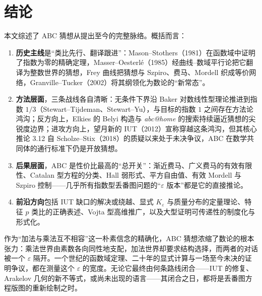 \section{结论}\label{sec:conclusion}

本文综述了 ABC 猜想从提出至今的完整脉络。概括而言：

\begin{enumerate}[label=(\arabic*)]
    \item \textbf{历史主线}是“类比先行、翻译跟进”：Mason--Stothers（1981）在函数域中证明了指数为零的精确定理，Masser--Oesterl\'e（1985）经曲线--数域平行论把它翻译为整数世界的猜想，Frey 曲线把猜想与 Szpiro、费马、Mordell 织成等价网络，Granville--Tucker（2002）将其纲领化为数论的“新常态”。
    \item \textbf{方法层面}，三条战线各自清晰：无条件下界沿 Baker 对数线性型理论推进到指数 $1/3$（Stewart--Tijdeman、Stewart--Yu），与目标的指数 $1$ 之间存在方法论鸿沟；反方向上，Elkies 的 Belyi 构造与 \textit{abc@home} 的搜索持续逼近猜想的尖锐度边界；进攻方向上，望月新的 IUT（2012）宣称穿越这条鸿沟，但其核心推论 3.12 自 Scholze--Stix（2018）的质疑以来处于未决争议，ABC 在数学共同体的通行标准下仍是开放猜想。
    \item \textbf{后果层面}，ABC 是性价比最高的“总开关”：渐近费马、广义费马的有效有限性、Catalan 型方程的分类、Hall 弱形式、平方自由值、有效 Mordell 与 Szpiro 控制——几乎所有指数型丢番图问题的“$\varepsilon$ 版本”都是它的直接推论。
    \item \textbf{前沿方向}包括 IUT 缺口的解决或绕越、显式 $K_\varepsilon$ 与质量分布的定量理论、特征 $p$ 类比的正确表述、Vojta 型高维推广，以及大型证明可传递性的制度化与形式化。
\end{enumerate}

作为“加法与乘法互不相容”这一朴素信念的精确化，ABC 猜想浓缩了数论的根本张力：乘法世界由素数各向同性地支配，加法世界却要求结构选择，而两者的对话被一个 $\varepsilon$ 隔开。一个世纪的函数域定理、二十年的显式计算与一场至今未决的证明争议，都在测量这个 $\varepsilon$ 的宽度。无论它最终由何条路线闭合——IUT 的修复、Arakelov 几何的新不等式，或尚未出现的语言——其闭合之日，都将是丢番图方程版图的重新绘制之时。
